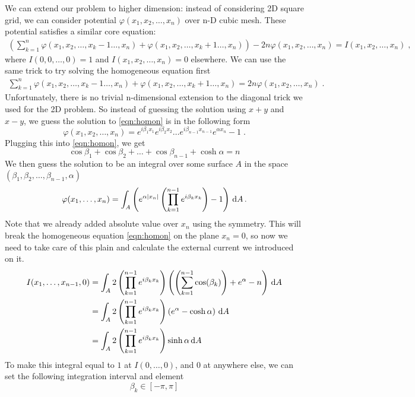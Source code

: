 \documentclass[10pt,a4paper,draft]{article}
\begin{document}
	 We can extend our problem to higher dimension: instead of considering 2D square grid, we can consider potential $\varphi(x_1,x_2,\dots,x_n)$ over n-D cubic mesh. These potential satisfies a similar core equation:
	 \begin{align}
	 \left(\sum_{k=1}^n \varphi(x_1,x_2,\dots,x_k-1\dots,x_n)+\varphi(x_1,x_2,\dots,x_k+1\dots,x_n)\right) - 2n\varphi(x_1,x_2,\dots,x_n) = I(x_1,x_2,\dots,x_n)\;, \label{eq:extension}
	 \end{align}
	 where $I(0,0,\dots,0) = 1$ and $I(x_1,x_2,\dots,x_n) = 0$ elsewhere. We can use the same trick to try solving the homogeneous equation first
	  \begin{align}
	 	 \sum_{k=1}^n \varphi(x_1,x_2,\dots,x_k-1\dots,x_n)+\varphi(x_1,x_2,\dots,x_k+1\dots,x_n) = 2n\varphi(x_1,x_2,\dots,x_n)\;.\label{eqn:homon}
	 \end{align}
	 Unfortunately, there is no trivial n-dimensional extension to the diagonal trick we used for the 2D problem. So instead of guessing the solution using $x+y$ and $x-y$, we guess the solution to \eqref{eqn:homon} is in the following form
	 \[
	 \varphi(x_1,x_2,\dots,x_n) = e^{i\beta_1 x_1} e^{i\beta_2 x_2}\dots e^{i\beta_{n-1} x_{n-1}} e^{\alpha x_n} - 1\;.
	 \]
	 Plugging this into \eqref{eqn:homon}, we get
	 \[
	 \cos\beta_1+\cos\beta_2+\dots+\cos\beta_{n-1}+\cosh\alpha = n
	 \]
	 We then guess the solution to be an integral over some surface $A$ in the space $(\beta_1,\beta_2,\dots,\beta_{n-1},\alpha)$
	 \[
	 \varphi(x_1,\dots,x_n) = \int_A\left( e^{\alpha |x_n|}\left(\prod_{k=1}^{n-1}e^{i\beta_k x_k}\right) - 1\right)\,\mathrm{d} A\,.
	 \]
	 Note that we already added absolute value over $x_n$ using the symmetry. This will break the homogeneous equation \eqref{eqn:homon} on the plane $x_n = 0$, so now we need to take care of this plain and calculate the external current we introduced on it.
	 \begin{align*}
	 I(x_1,\dots,x_{n-1},0) &= \int_A 2\left(\prod_{k=1}^{n-1}e^{i\beta_k x_k}\right) \left(\left(\sum_{k=1}^{n-1}\cos(\beta_k)\right)+e^{\alpha}-n\right)\,\mathrm{d} A \\
	 &= \int_A 2\left( \prod_{k=1}^{n-1}e^{i\beta_k x_k}\right) \left(e^{\alpha}-\cosh\alpha\right)\,\mathrm{d} A\\
	 &= \int_A 2 \left(\prod_{k=1}^{n-1}e^{i\beta_k x_k}\right) \sinh\alpha\,\mathrm{d} A
	 \end{align*}
	 To make this integral equal to $1$ at $I(0,\dots,0)$, and $0$ at anywhere else, we can set the following integration interval and element 
	 \[
	 \beta_k \in [-\pi, \pi]
	 \]
\end{document}
